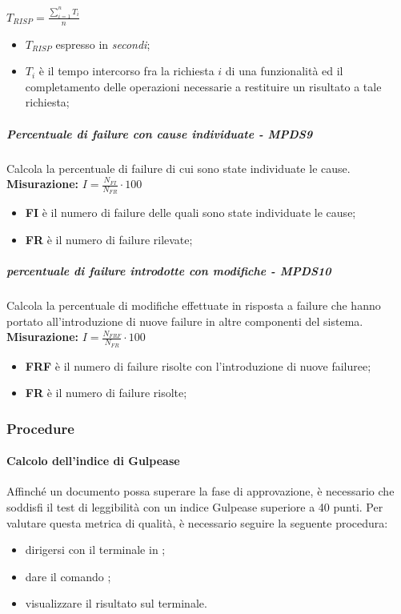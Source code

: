 $T_{RISP} = \frac{\sum_{i=1}^{n} T_{i}}{n}$
\begin{itemize}
	\item \textbf{$T_{RISP}$} espresso in \textit{secondi};
	\item \textbf{$T_{i}$} è il tempo intercorso fra la richiesta $i$ di una funzionalità ed il completamento delle operazioni necessarie a restituire un risultato a tale richiesta;
\end{itemize}
\subparagraph{Percentuale di failure con cause individuate - MPDS9}
Calcola la percentuale di failure di cui sono state individuate le cause.
\textbf{Misurazione:}
$I=\frac{N_{FI}}{N_{FR}} \cdot 100$
\begin{itemize}
	\item \textbf{FI}  è il numero di failure delle quali sono state individuate le cause;
	\item \textbf{FR} è il numero di failure rilevate;
\end{itemize}
\subparagraph{percentuale di failure introdotte con modifiche - MPDS10}
Calcola la percentuale di modifiche effettuate in risposta a failure che hanno portato all'introduzione di nuove failure in altre componenti del sistema.
\textbf{Misurazione:}
$I=\frac{N_{FRF}}{N_{FR}} \cdot 100$
\begin{itemize}
	\item \textbf{FRF}  è il numero di failure risolte con l'introduzione di nuove failuree;
	\item \textbf{FR} è il numero di failure risolte;
\end{itemize}

\subsubsection{Procedure}
\paragraph{Calcolo dell'indice di Gulpease}
Affinché un documento possa superare la fase di approvazione, è necessario che soddisfi il test di leggibilità con un indice Gulpease superiore a 40 punti. Per valutare questa metrica di qualità, è necessario seguire la seguente procedura:
\begin{itemize}
	\item dirigersi con il terminale in \GulScript{};
	\item dare il comando ;
	\item visualizzare il risultato sul terminale.
\end{itemize}
